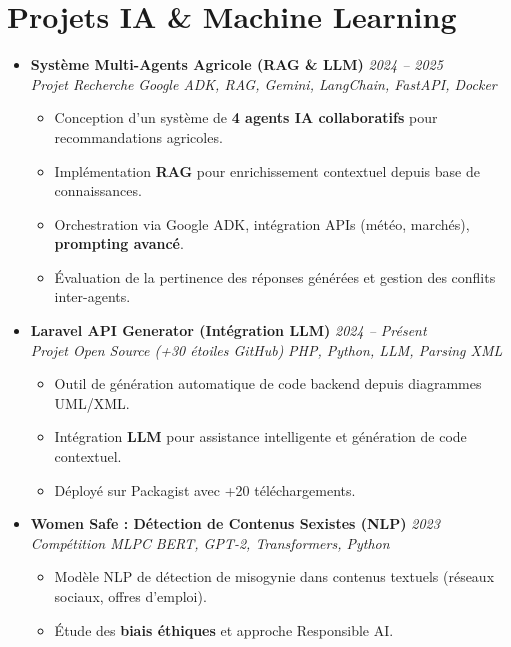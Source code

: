 \documentclass[a4paper,11pt]{article}
\begin{document}
\section{Projets IA \& Machine Learning}
\begin{itemize}[leftmargin=*, label={-}]

\item \textbf{Système Multi-Agents Agricole (RAG \& LLM)} \hfill \textit{2024 -- 2025} \\
\textit{Projet Recherche} \hfill \textit{Google ADK, RAG, Gemini, LangChain, FastAPI, Docker}
\vspace{-2pt}
    \begin{itemize}[leftmargin=0.4cm, nosep, label=\tiny$\bullet$]
        \item \small{Conception d'un système de \textbf{4 agents IA collaboratifs} pour recommandations agricoles.}
        \item \small{Implémentation \textbf{RAG} pour enrichissement contextuel depuis base de connaissances.}
        \item \small{Orchestration via Google ADK, intégration APIs (météo, marchés), \textbf{prompting avancé}.}
        \item \small{Évaluation de la pertinence des réponses générées et gestion des conflits inter-agents.}
    \end{itemize}
\vspace{3pt}

\item \textbf{Laravel API Generator (Intégration LLM)} \hfill \textit{2024 -- Présent} \\
\textit{Projet Open Source (+30 étoiles GitHub)} \hfill \textit{PHP, Python, LLM, Parsing XML}
\vspace{-2pt}
    \begin{itemize}[leftmargin=0.4cm, nosep, label=\tiny$\bullet$]
        \item \small{Outil de génération automatique de code backend depuis diagrammes UML/XML.}
        \item \small{Intégration \textbf{LLM} pour assistance intelligente et génération de code contextuel.}
        \item \small{Déployé sur Packagist avec +20 téléchargements.}
    \end{itemize}
\vspace{3pt}

\item \textbf{Women Safe : Détection de Contenus Sexistes (NLP)} \hfill \textit{2023} \\
\textit{Compétition MLPC} \hfill \textit{BERT, GPT-2, Transformers, Python}
\vspace{-2pt}
    \begin{itemize}[leftmargin=0.4cm, nosep, label=\tiny$\bullet$]
        \item \small{Modèle NLP de détection de misogynie dans contenus textuels (réseaux sociaux, offres d'emploi).}
        \item \small{Étude des \textbf{biais éthiques} et approche Responsible AI.}
    \end{itemize}
\vspace{3pt}


\end{itemize}
\end{document}
